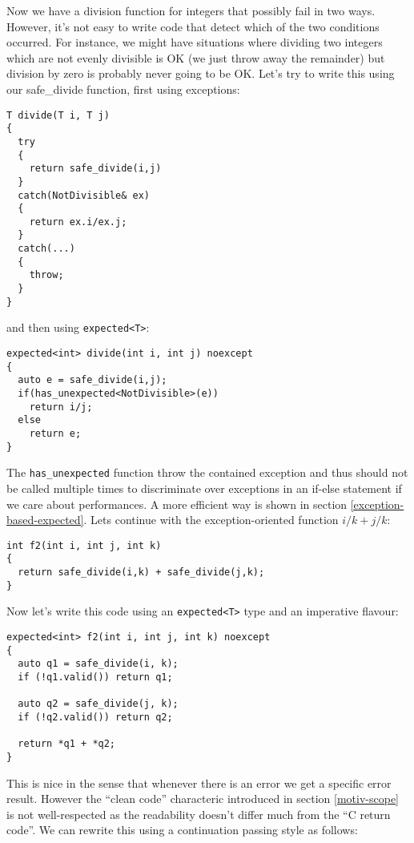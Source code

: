 \documentclass[a4paper,10pt]{article}
\newcommand{\cpp}[1]{\lstinline{#1}}
\begin{document}
Now we have a division function for integers that possibly fail in two ways. However, it's not easy to write code that detect which of the two conditions occurred. For instance, we might have situations where dividing two integers which are not evenly divisible is OK (we just throw away the remainder) but division by zero is probably never going to be OK. Let's try to write this using our safe_divide function, first using exceptions:

\begin{lstlisting}
T divide(T i, T j)
{
  try
  {
    return safe_divide(i,j)
  }
  catch(NotDivisible& ex)
  {
    return ex.i/ex.j;
  }
  catch(...)
  {
    throw;
  }
}
\end{lstlisting}

\noindent
and then using \cpp{expected<T>}:

\begin{lstlisting}
expected<int> divide(int i, int j) noexcept
{
  auto e = safe_divide(i,j);
  if(has_unexpected<NotDivisible>(e))
    return i/j;
  else 
    return e;
}
\end{lstlisting}

\noindent
The \cpp{has_unexpected} function throw the contained exception and thus should not be called multiple times to discriminate over exceptions in an if-else statement if we care about performances. A more efficient way is shown in section \ref{exception-based-expected}. Lets continue with the exception-oriented function $i/k + j/k$:

\begin{lstlisting}
int f2(int i, int j, int k)
{
  return safe_divide(i,k) + safe_divide(j,k);
}
\end{lstlisting}

\noindent
Now let's write this code using an \cpp{expected<T>} type and an imperative flavour:

\begin{lstlisting}
expected<int> f2(int i, int j, int k) noexcept
{
  auto q1 = safe_divide(i, k);
  if (!q1.valid()) return q1;

  auto q2 = safe_divide(j, k);
  if (!q2.valid()) return q2;

  return *q1 + *q2;
}
\end{lstlisting}

This is nice in the sense that whenever there is an error we get a specific error result. However the ``clean code'' characteric introduced in section \ref{motiv-scope} is not well-respected as the readability doesn't differ much from the ``C return code''. We can rewrite this using a continuation passing style as follows:
\end{document}
